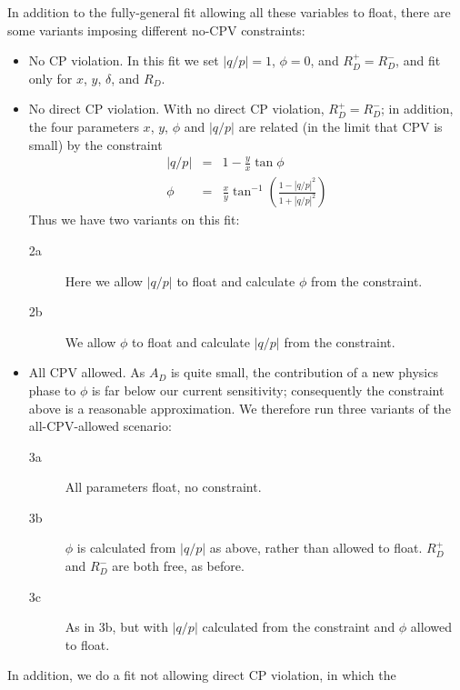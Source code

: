 In addition to the fully-general fit allowing all these variables to float, 
there are some variants imposing different no-CPV constraints:
\begin{itemize}
\item No CP violation. In this fit we set $|q/p|=1$, $\phi=0$, and $R_D^+=R_D^-$, 
and fit only for $x$, $y$, $\delta$, and $R_D$. 
\item No direct CP violation. With no direct CP violation, $R_D^+=R_D^-$;
in addition, the four parameters $x$, $y$, $\phi$ and $|q/p|$ are related 
(in the limit that CPV is small) by the constraint
\begin{eqnarray}
|q/p| &=& 1 - \frac{y}{x}\tan\phi\\
\phi &=& \frac{x}{y}\tan^{-1}\left(\frac{1-|q/p|^2}{1+|q/p|^2}\right)
\end{eqnarray}
Thus we have two variants on this fit:
\begin{description}
\item[2a] Here we allow $|q/p|$ to float and calculate $\phi$
from the constraint. 
\item[2b] We allow $\phi$ to float and calculate $|q/p|$ from the constraint. 
\end{description}
\item All CPV allowed. As $A_D$ is quite
small, the contribution of a new physics phase to $\phi$ is far below
our current sensitivity; consequently the constraint above is a reasonable
approximation. We therefore run three variants of the all-CPV-allowed 
scenario:
\begin{description}
\item[3a] All parameters float, no constraint.
\item[3b] $\phi$ is calculated from $|q/p|$ as above, rather than allowed to float.
$R_D^+$ and $R_D^-$ are both free, as before.
\item[3c] As in 3b, but with $|q/p|$ calculated from the constraint and $\phi$ allowed
to float.
\end{description}
\end{itemize}

In addition, we do a fit not allowing direct CP violation, in which the


